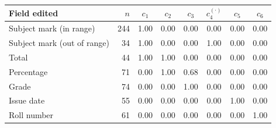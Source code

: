 \begin{tabular}{lrcccccc}
\toprule
Field edited & $n$ & $c_{1}$ & $c_{2}$ & $c_{3}$ & $c_{4}^{(\cdot)}$ & $c_{5}$ & $c_{6}$\\
\midrule
Subject mark (in range) & 244 & 1.00 & 0.00 & 0.00 & 0.00 & 0.00 & 0.00\\
Subject mark (out of range) & 34 & 1.00 & 0.00 & 0.00 & 1.00 & 0.00 & 0.00\\
Total & 44 & 1.00 & 1.00 & 0.00 & 0.00 & 0.00 & 0.00\\
Percentage & 71 & 0.00 & 1.00 & 0.68 & 0.00 & 0.00 & 0.00\\
Grade & 74 & 0.00 & 0.00 & 1.00 & 0.00 & 0.00 & 0.00\\
Issue date & 55 & 0.00 & 0.00 & 0.00 & 0.00 & 1.00 & 0.00\\
Roll number & 61 & 0.00 & 0.00 & 0.00 & 0.00 & 0.00 & 1.00\\
\bottomrule
\end{tabular}
